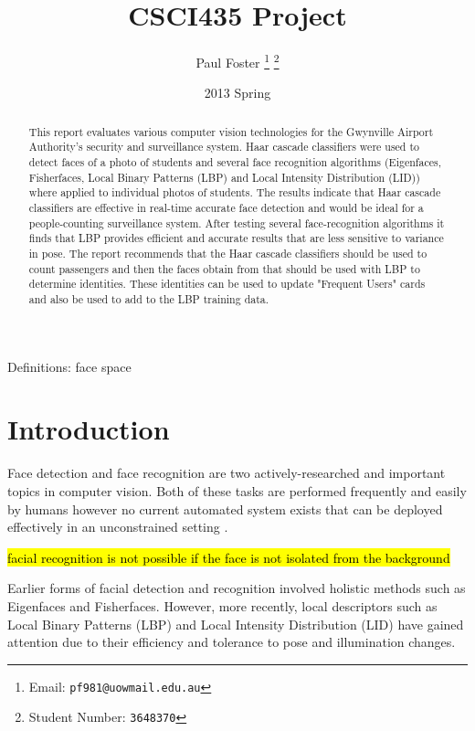 \documentclass{article}
\begin{document}
\title{CSCI435 Project}
\author{Paul Foster
	\thanks{Email: \texttt{pf981@uowmail.edu.au}}
	\thanks{Student Number: \texttt{3648370}}}
\date{2013 Spring}

\maketitle

\renewcommand\abstractname{Executive Summary}
\begin{abstract}
This report evaluates various computer vision technologies for the Gwynville Airport Authority's security and surveillance system. Haar cascade classifiers were used to detect faces of a photo of students and several face recognition algorithms (Eigenfaces, Fisherfaces, Local Binary Patterns (LBP) and Local Intensity Distribution (LID)) where applied to individual photos of students. The results indicate that Haar cascade classifiers are effective in real-time accurate face detection and would be ideal for a people-counting surveillance system. After testing several face-recognition algorithms it finds that LBP provides efficient and accurate results that are less sensitive to variance in pose. The report recommends that the Haar cascade classifiers should be used to count passengers and then the faces obtain from that should be used with LBP to determine identities. These identities can be used to update "Frequent Users" cards and also be used to add to the LBP training data.
\end{abstract}

Definitions: face space

\section{Introduction}
Face detection and face recognition are two actively-researched and important topics in computer vision. Both of these tasks are performed frequently and easily by humans however no current automated system exists that can be deployed effectively in an unconstrained setting \cite{sinha2006face}.

\hl{facial recognition is not possible if the face is not isolated from the background}\cite{wilson2006facial}

Earlier forms of facial detection and recognition involved holistic methods such as Eigenfaces\cite{turk1991eigenfaces} and Fisherfaces\cite{belhumeur1997eigenfaces}. However, more recently, local descriptors such as Local Binary Patterns (LBP)\cite{ahonen2004face} and Local Intensity Distribution (LID)\cite{nguyen2011local} have gained attention due to their efficiency and tolerance to pose and illumination changes.
\end{document}
